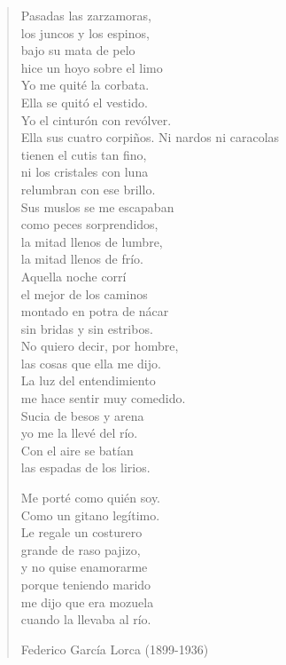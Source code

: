 \documentclass[12pt, twoside]{book}
\begin{document}
\begin{verse}
Pasadas las zarzamoras,\\
los juncos y los espinos,\\
bajo su mata de pelo\\
hice un hoyo sobre el limo\\
Yo me quité la corbata.\\
Ella se quitó el vestido.\\
Yo el cinturón con revólver.\\
Ella sus cuatro corpiños.\newpage
Ni nardos ni caracolas\\
tienen el cutis tan fino,\\
ni los cristales con luna\\
relumbran con ese brillo.\\
Sus muslos se me escapaban\\
como peces sorprendidos,\\
la mitad llenos de lumbre,\\
la mitad llenos de frío.\\
Aquella noche corrí\\
el mejor de los caminos\\
montado en potra de nácar\\
sin bridas y sin estribos.\\
No quiero decir, por hombre,\\
las cosas que ella me dijo.\\
La luz del entendimiento\\
me hace sentir muy comedido.\\
Sucia de besos y arena\\
yo me la llevé del río.\\
Con el aire se batían\\
las espadas de los lirios.\newline

Me porté como quién soy.\\
Como un gitano legítimo.\\
Le regale un costurero\\
grande de raso pajizo,\\
y no quise enamorarme\\
porque teniendo marido\\
me dijo que era mozuela\\
cuando la llevaba al río.

Federico García Lorca (1899-1936)

\end{verse}
\newpage
\end{document}

